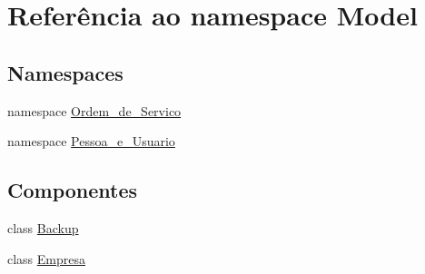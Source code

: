 \hypertarget{namespace_model}{}\section{Referência ao namespace Model}
\label{namespace_model}
\subsection*{Namespaces}
\begin{DoxyCompactItemize}
\item 
namespace \hyperlink{namespace_model_1_1_ordem__de___servico}{Ordem\+\_\+de\+\_\+\+Servico}
\item 
namespace \hyperlink{namespace_model_1_1_pessoa__e___usuario}{Pessoa\+\_\+e\+\_\+\+Usuario}
\end{DoxyCompactItemize}
\subsection*{Componentes}
\begin{DoxyCompactItemize}
\item 
class \hyperlink{class_model_1_1_backup}{Backup}
\item 
class \hyperlink{class_model_1_1_empresa}{Empresa}
\end{DoxyCompactItemize}
